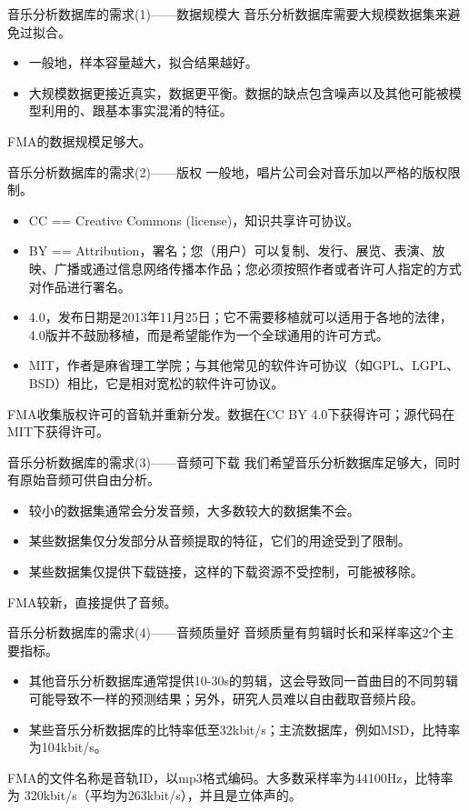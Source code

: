 \documentclass{beamer}
\begin{document}
\begin{frame}{音乐分析数据库的需求(1)——数据规模大}
	音乐分析数据库需要大规模数据集来避免过拟合。
	\begin{itemize}
		\item 一般地，样本容量越大，拟合结果越好。
		\item 大规模数据更接近真实，数据更平衡。数据的缺点包含噪声以及其他可能被模型利用的、跟基本事实混淆的特征。
	\end{itemize}
	FMA的数据规模足够大。
\end{frame}

\begin{frame}{音乐分析数据库的需求(2)——版权}
	一般地，唱片公司会对音乐加以严格的版权限制。
	\begin{itemize}
		\item CC == Creative Commons (license)，知识共享许可协议。
		\item BY == Attribution，署名；您（用户）可以复制、发行、展览、表演、放映、广播或通过信息网络传播本作品；您必须按照作者或者许可人指定的方式对作品进行署名。
		\item 4.0，发布日期是2013年11月25日；它不需要移植就可以适用于各地的法律，4.0版并不鼓励移植，而是希望能作为一个全球通用的许可方式。
		\item MIT，作者是麻省理工学院；与其他常见的软件许可协议（如GPL、LGPL、BSD）相比，它是相对宽松的软件许可协议。
	\end{itemize}
	FMA收集版权许可的音轨并重新分发。数据在CC BY 4.0下获得许可；源代码在MIT下获得许可。
\end{frame}

\begin{frame}{音乐分析数据库的需求(3)——音频可下载}
	我们希望音乐分析数据库足够大，同时有原始音频可供自由分析。
	\begin{itemize}
		\item 较小的数据集通常会分发音频，大多数较大的数据集不会。
		\item 某些数据集仅分发部分从音频提取的特征，它们的用途受到了限制。
		\item 某些数据集仅提供下载链接，这样的下载资源不受控制，可能被移除。
	\end{itemize}
	FMA较新，直接提供了音频。
\end{frame}

\begin{frame}{音乐分析数据库的需求(4)——音频质量好}
	音频质量有剪辑时长和采样率这2个主要指标。
	\begin{itemize}
		\item 其他音乐分析数据库通常提供10-30s的剪辑，这会导致同一首曲目的不同剪辑可能导致不一样的预测结果；另外，研究人员难以自由截取音频片段。
		\item 某些音乐分析数据库的比特率低至32kbit/s；主流数据库，例如MSD，比特率为104kbit/s。
	\end{itemize}
	FMA的文件名称是音轨ID，以mp3格式编码。大多数采样率为44100Hz，比特率为 320kbit/s（平均为263kbit/s），并且是立体声的。
\end{frame}
\end{document}
